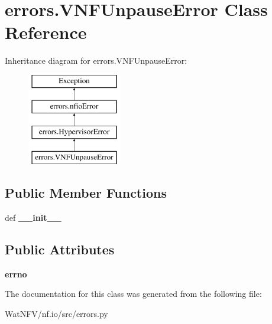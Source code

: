 \hypertarget{classerrors_1_1VNFUnpauseError}{\section{errors.\-V\-N\-F\-Unpause\-Error Class Reference}
\label{classerrors_1_1VNFUnpauseError}
}
Inheritance diagram for errors.\-V\-N\-F\-Unpause\-Error\-:\begin{figure}[H]
\begin{center}
\leavevmode
\includegraphics[height=4.000000cm]{classerrors_1_1VNFUnpauseError}
\end{center}
\end{figure}
\subsection*{Public Member Functions}
\begin{DoxyCompactItemize}
\item 
\hypertarget{classerrors_1_1VNFUnpauseError_a85aae2b447871d3ca8a4c9253b0f378b}{def {\bfseries \-\_\-\-\_\-init\-\_\-\-\_\-}}\label{classerrors_1_1VNFUnpauseError_a85aae2b447871d3ca8a4c9253b0f378b}

\end{DoxyCompactItemize}
\subsection*{Public Attributes}
\begin{DoxyCompactItemize}
\item 
\hypertarget{classerrors_1_1VNFUnpauseError_a80bf041b87465d52bde24a08444c0b6b}{{\bfseries errno}}\label{classerrors_1_1VNFUnpauseError_a80bf041b87465d52bde24a08444c0b6b}

\end{DoxyCompactItemize}


The documentation for this class was generated from the following file\-:\begin{DoxyCompactItemize}
\item 
Wat\-N\-F\-V/nf.\-io/src/errors.\-py\end{DoxyCompactItemize}
